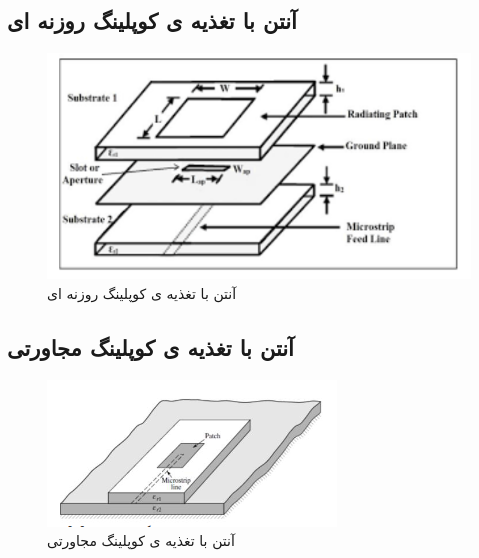 \subsection{آنتن با تغذیه ی کوپلینگ روزنه ای}
\begin{figure}
	\centering
	\includegraphics[scale=0.4]{Images/fig4.png}
	\caption{آنتن با تغذیه ی کوپلینگ روزنه ای}
	\label{fig4}
\end{figure}

\subsection{آنتن با تغذیه ی کوپلینگ مجاورتی}
\begin{figure}
	\centering
	\includegraphics[scale=0.7]{Images/fig5.png}
	\caption{آنتن با تغذیه ی کوپلینگ مجاورتی}
	\label{fig5}
\end{figure}

